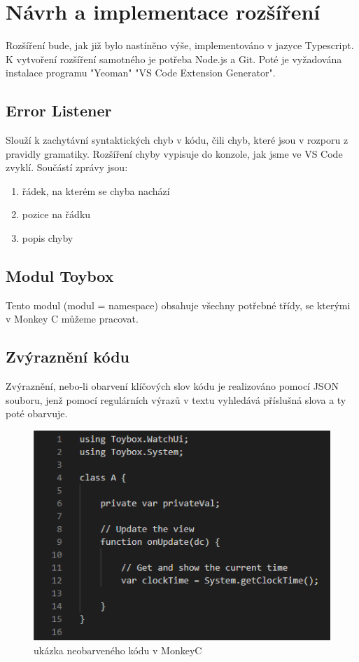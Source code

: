 \chapter{Návrh a implementace rozšíření}
Rozšíření bude, jak již bylo nastíněno výše, implementováno v jazyce Typescript. 
K vytvoření rozšíření samotného je potřeba Node.js a Git. Poté je vyžadována instalace programu "Yeoman" "VS Code Extension Generator".

\section{Error Listener}
Slouží k zachytávní syntaktických chyb v kódu, čili chyb, které jsou v rozporu z pravidly gramatiky. Rozšíření chyby vypisuje do konzole, jak jsme ve VS Code zvyklí. Součástí zprávy jsou:
\begin{enumerate}
\item řádek, na kterém se chyba nachází
\item pozice na řádku
\item popis chyby
\end{enumerate}

\section{Modul Toybox}
Tento modul (modul = namespace) obsahuje všechny potřebné třídy, se kterými v Monkey C můžeme pracovat.

\section{Zvýraznění kódu}

Zvýraznění, nebo-li obarvení klíčových slov kódu je realizováno pomocí JSON souboru, jenž pomocí regulárních výrazů v textu vyhledává příslušná slova a ty poté obarvuje.
\\
\begin{figure}
	\centering
	\includegraphics[]{images/uncolored_code}
	\caption{ukázka neobarveného kódu v MonkeyC}
	\label{img:uncolored_code}
\end{figure}


